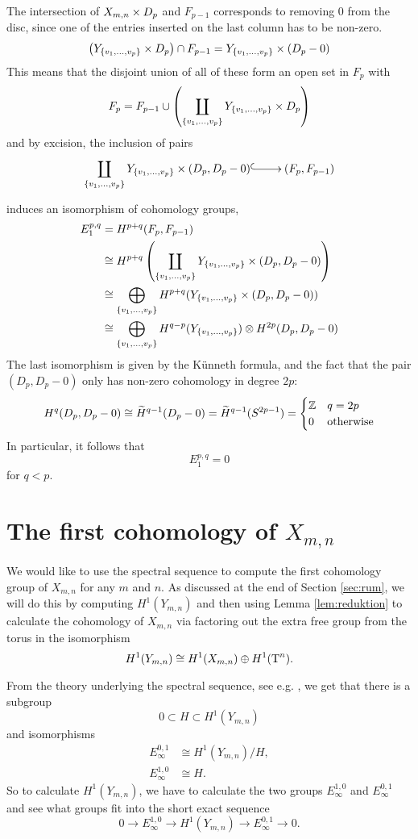 The intersection of $X_{m,n}\times D_p$ and $F_{p-1}$ corresponds to
removing 0 from the disc, since one of the entries inserted on the
last column has to be non-zero.
\[ \left(Y_{\left\{ v_1,\dots,v_p \right\}}\times D_p \right) \cap F_{p-1} =
Y_{\left\{ v_1,\dots,v_p \right\}} \times \left(D_p-0\right) \]
This means that the disjoint union of all of these form an open set in
$F_p$ with
\[ F_p = F_{p-1}\cup \left(\coprod_{\left\{ v_1,\dots,v_p \right\}}
  Y_{\left\{ v_1,\dots,v_p \right\}}\times D_p\right) \]
and by excision, the inclusion of pairs
\[ \xymatrix{ \displaystyle \coprod_{\set{v_1,\dots,v_p}}
  Y_{\set{v_1,\dots,v_p}}\times (D_p,D_p-0) \ar@{^(->}[r] &
  (F_p,F_{p-1}) } \]
induces an isomorphism of cohomology groups,
\begin{align*}
  E_1^{p,q} &= H^{p+q}(F_p,F_{p-1}) \\
            &\cong H^{p+q}\left(\coprod_{\left\{ v_1,\dots,v_p \right\}}
              Y_{\left\{ v_1,\dots,v_p \right\}}\times (D_p,D_p-0)\right) \\   
            &\cong \bigoplus_{\left\{ v_1,\dots,v_p \right\}}
              H^{p+q}(Y_{\left\{ v_1,\dots,v_p \right\}}\times (D_p,D_p-0)) \\   
            &\cong \bigoplus_{\left\{ v_1,\dots,v_p \right\}}
              H^{q-p}(Y_{\left\{ v_1,\dots,v_p \right\}})\otimes H^{2p}(D_p,D_p-0)
\end{align*}
The last isomorphism is given by the K\"unneth formula, and the fact
that the pair $(D_p,D_p-0)$ only has non-zero cohomology in degree
$2p$:
\[ H^q(D_p,D_p-0) \cong \widetilde H^{q-1}(D_p-0) = \widetilde
H^{q-1}(S^{2p-1}) =
\begin{cases}
  \mathbb{Z} & q = 2p \\
  0 & \text{otherwise}
\end{cases} \]
In particular, it follows that
\[ E_1^{p,q} = 0 \]
for $q < p$.

\section{The first cohomology of $X_{m,n}$}
\label{sec:firstcohom}

We would like to use the spectral sequence to compute the first
cohomology group of $X_{m,n}$ for any $m$ and $n$. As discussed at the
end of Section \ref{sec:rum}, we will do this by computing
$H^1(Y_{m,n})$ and
then using Lemma \ref{lem:reduktion} to calculate the cohomology of
$X_{m,n}$ via factoring out the extra free group from the torus
in the isomorphism
\[ H^1(Y_{m,n}) \cong H^1(X_{m,n}) \oplus H^1(\operatorname{T}^n). \]

From the theory
underlying the spectral sequence, see e.g. \cite[Chapter
1]{hatcherss}, we get that there is a subgroup
\[ 0 \subset H \subset H^1(Y_{m,n}) \]
and isomorphisms
\begin{align*}
  E_\infty^{0,1} &\cong H^1(Y_{m,n})/H, \\
  E_\infty^{1,0} &\cong H.
\end{align*}
So to calculate $H^1(Y_{m,n})$, we have to calculate the two groups
$E_\infty^{1,0}$ and $E_\infty^{0,1}$ and see what groups fit
into the short exact sequence
\[ 0 \to E^{1,0}_\infty \to H^1(Y_{m,n}) \to E^{0,1}_\infty \to 0. \]

